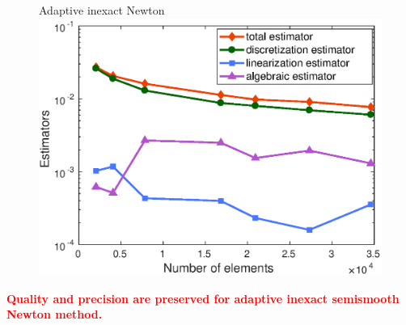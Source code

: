 \documentclass{beamer}
\begin{document}
\begin{frame}
\begin{figure}
\begin{minipage}[c]{.33\linewidth}
   \centering
   Adaptive inexact Newton
\includegraphics[width=\textwidth]{fig_article/adapt_inexact_resolution_convergence_estimator_number_elements.eps}     
\end{minipage}
\end{figure}

\textcolor{red}{\textbf{Quality and precision are preserved for adaptive inexact semismooth Newton method.}}


\end{frame}
\end{document}
